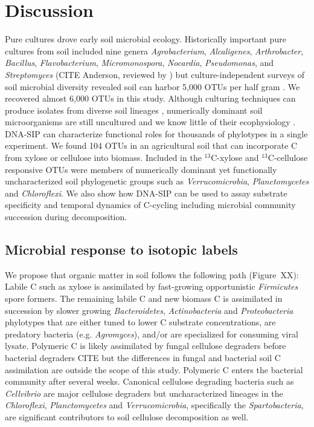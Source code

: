 \section{Discussion}
Pure cultures drove early soil microbial ecology. Historically important pure
cultures from soil included nine genera \textit{Agrobacterium},
\textit{Alcaligenes}, \textit{Arthrobacter}, \textit{Bacillus},
\textit{Flavobacterium}, \textit{Micromonospora}, \textit{Nocardia},
\textit{Pseudomonas}, and \textit{Streptomyces} (CITE Anderson, reviewed by
\citet{Janssen2006}) but culture-independent surveys of soil microbial
diversity revealed soil can harbor 5,000 OTUs per half gram
\citep{Schloss2006}. We recovered almost 6,000 OTUs in this study. Although
culturing techniques can produce isolates from diverse soil lineages
\citep{Janssen2002}, numerically dominant soil microorganisms are still
uncultured and we know little of their ecophysiology \citep{Janssen2006}.
DNA-SIP can characterize functional roles for thousands of phylotypes in
a single experiment. We found 104 OTUs in an agricultural soil that can
incorporate C from xylose or cellulose into biomass. Included in the
$^{13}$C-xylose and $^{13}$C-cellulose responsive OTUs were members of 
numerically dominant yet functionally uncharacterized soil phylogenetic groups
such as \textit{Verrucomicrobia}, \textit{Planctomycetes} and
\textit{Chloroflexi}. We also show how DNA-SIP can be used to assay substrate
specificity and temporal dynamics of C-cycling including microbial community
succession during decomposition.

\subsection{Microbial response to isotopic labels}
We propose that organic matter in soil follows the
following path (Figure~XX): Labile C such as xylose is assimilated by
fast-growing opportunistic \textit{Firmicutes} spore formers. The remaining
labile C and new biomass C is assimilated in succession by slower
growing \textit{Bacteroidetes}, \textit{Actinobacteria} and
\textit{Proteobacteria} phylotypes that are either tuned to lower C substrate
concentrations, are predatory bacteria (e.g. \textit{Agromyces}), and/or are
specialized for consuming viral lysate. Polymeric C is likely assimilated by
fungal cellulose degraders before bacterial degraders CITE but the differences
in fungal and bacterial soil C assimilation are outside the scope of this
study. Polymeric C enters the bacterial community after several weeks.
Canonical cellulose degrading bacteria such as \textit{Cellvibrio} are major
cellulose degraders but uncharacterized lineages in the \textit{Chloroflexi},
\textit{Planctomycetes} and \textit{Verrucomicrobia}, specifically the
\textit{Spartobacteria}, are significant contributors to soil cellulose
decomposition as well. 

